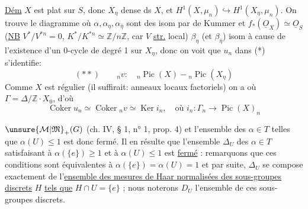 \uline{Dém} $X$ est plat sur $S$, donc $X_\eta$ dense ds $X$, et $H^1(X,\mu_n)\hookrightarrow H^1(X_\eta,\mu_n)$. On trouve le diagramme
où $\alpha,\alpha_\eta,\alpha_{\bar\eta}$ sont des isom par  de Kummer et $f_*(\underline O_X)\simeq\underline O_S$ (\uline{NB} $V^*/V^{*n}=0$, $K^*/K^{*n}\simeq\mathbb Z/n\mathbb Z$, car $V$ \uline{str.} local) $\beta_\eta$ (et $\beta_{\bar\eta}$)  isom à cause de l'existence d'un 0-cycle de degré 1 sur $X_\eta$, donc on voit que $u_n$ dans (*) s'identifie:
\[
(**)\qquad{}_nv:\quad{}_n\operatorname{Pic}(X)\mathbin{-}{}_n\operatorname{Pic}(X_\eta)
\]
Comme $X$ est régulier (il suffirait: anneaux locaux factoriels) on a
où $\Gamma=\Delta/\mathbb Z\cdot X_0$, d'où
\[
\operatorname{Coker}u_n\simeq\operatorname{Coker}{}_nv\simeq\operatorname{Ker}i_n,\quad\text{où }i_n:\Gamma_n\longrightarrow\operatorname{Pic}(X)_n
\]


$\unsure{\mathcal M|\mathfrak M}_+(G)$ (ch. IV, § 1, n° 1, prop. 4) et l'ensemble des $\alpha\in T$ telles que $\alpha(U)\leq 1$ est donc fermé. Il en résulte que l'ensemble $\Delta_U$ des $\alpha\in T$ satisfaisant à $\alpha(\{e\})\geq 1$ et à $\alpha(U)\leq 1$ est \uline{fermé} : remarquons que ces conditions sont équivalentes à $\alpha(\{e\})=\alpha(U)=1$ et par suite, $\Delta_U$ se compose exactement de l'\uline{ensemble des mesures de Haar normalisées des sous-groupes discrets} $H$ \uline{tels que} $H\cap U=\{e\}$ ; nous noterons $D_U$ l'ensemble de ces sous-groupes discrets.

